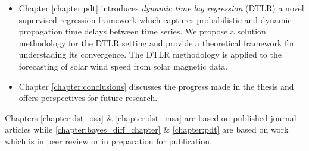 \begin{itemize}
    \item Chapter \ref{chapter:pdt} introduces \emph{dynamic time lag regression} (DTLR) a novel supervised 
    regression framework which captures probabilistic and dynamic propagation time delays between time series. 
    We propose a solution methodology for the DTLR setting and provide a theoretical framework for understading 
    its convergence. The DTLR methodology is applied to the forecasting of solar wind speed from solar magnetic data. 
    
    \item Chapter \ref{chapter:conclusions} discusses the progress made in the thesis and offers perspectives for 
    future research.
\end{itemize}


Chapters \ref{chapter:dst_osa} \& \ref{chapter:dst_msa} are based on published journal articles 
while \ref{chapter:bayes_diff_chapter} \& \ref{chapter:pdt} are based on work which is in peer review or in 
preparation for publication.  